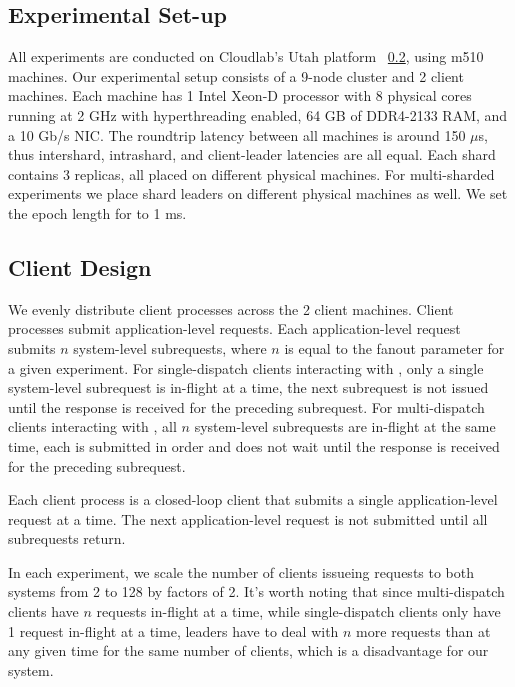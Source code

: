 \subsection{Experimental Set-up}
All experiments are conducted on Cloudlab's Utah platform ~\ref{}, using m510 machines. 
Our experimental setup consists of a 9-node cluster and 2 client machines. 
Each machine has 1 Intel Xeon-D processor with 8 physical cores running at 2 GHz with hyperthreading enabled, 64 GB of DDR4-2133 RAM, and a 10 Gb/s NIC. 
The roundtrip latency between all machines is around 150 $\mu$s, thus intershard, intrashard, and client-leader latencies are all equal. 
Each shard contains 3 replicas, all placed on different physical machines. For multi-sharded experiments we place shard leaders on different physical machines as well. 
We set the epoch length for \system to 1 ms.

\subsection{Client Design}
We evenly distribute client processes across the 2 client machines. Client processes submit application-level requests. Each application-level request submits $n$ system-level subrequests, where $n$ is equal to the fanout parameter for a given experiment. For single-dispatch clients interacting with \mpaxos, only a single system-level subrequest is in-flight at a time, the next subrequest is not issued until the response is received for the preceding subrequest. For multi-dispatch clients interacting with \system, all $n$ system-level subrequests are in-flight at the same time, each is submitted in order and does not wait until the response is received for the preceding subrequest.

Each client process is a closed-loop client that submits a single application-level request at a time. The next application-level request is not submitted until all subrequests return. 

In each experiment, we scale the number of clients issueing requests to both systems from 2 to 128 by factors of 2. It's worth noting that since multi-dispatch clients have $n$ requests in-flight at a time, while single-dispatch clients only have 1 request in-flight at a time, \system leaders have to deal with $n$ more requests than \mpaxos at any given time for the same number of clients, which is a disadvantage for our system.


